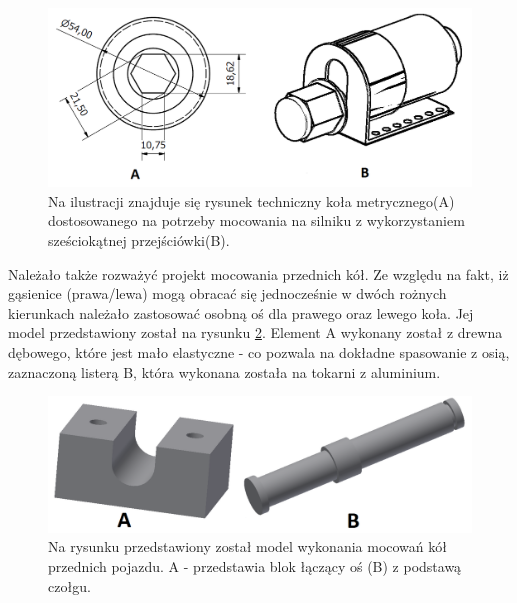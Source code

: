   \begin{figure}[H]
    \begin{center}
      \includegraphics[scale=0.40]{imgs/moc_kol_tyl.png}
 	\caption[Model tylnych kół.]{\small{Na ilustracji znajduje się rysunek techniczny koła metrycznego(A) dostosowanego na potrzeby mocowania na silniku z wykorzystaniem sześciokątnej przejściówki(B).}}
	\label{zamocowanie_szesciokatne}
    \end{center}
  \end{figure}

Należało także rozważyć projekt mocowania przednich kół. Ze względu na fakt, iż gąsienice (prawa/lewa) mogą obracać się jednocześnie w dwóch rożnych kierunkach należało zastosować osobną oś dla prawego oraz lewego koła. Jej model przedstawiony został na rysunku \ref{zamocowanie_przod}. Element A wykonany został z drewna dębowego, które jest mało elastyczne - co pozwala na dokładne spasowanie z osią, zaznaczoną listerą B, która wykonana została na tokarni z aluminium.

  \begin{figure}[H]
    \begin{center}
      \includegraphics[scale=0.40]{imgs/moc_kol_prz.png}
 	\caption[Model mocowania kół przednich.]{\small{Na rysunku przedstawiony został model wykonania mocowań kół przednich pojazdu. A - przedstawia blok łączący oś (B) z podstawą czołgu.}}
	\label{zamocowanie_przod}
    \end{center}
  \end{figure}